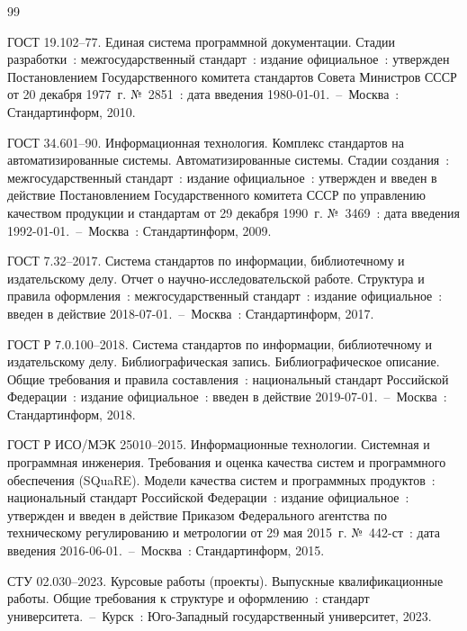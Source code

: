 

\begin{thebibliography}{99}

 ГОСТ 19.102--77. Единая система программной документации. Стадии разработки~: межгосударственный стандарт~: издание официальное~: утвержден Постановлением Государственного комитета стандартов Совета Министров СССР от 20 декабря 1977~г. №~2851~: дата введения 1980-01-01.~--~Москва~: Стандартинформ, 2010.

 ГОСТ 34.601--90. Информационная технология. Комплекс стандартов на автоматизированные системы. Автоматизированные системы. Стадии создания~: межгосударственный стандарт~: издание официальное~: утвержден и введен в действие Постановлением Государственного комитета СССР по управлению качеством продукции и стандартам от 29 декабря 1990~г. №~3469~: дата введения 1992-01-01.~--~Москва~: Стандартинформ, 2009.

 ГОСТ 7.32--2017. Система стандартов по информации, библиотечному и издательскому делу. Отчет о научно-исследовательской работе. Структура и правила оформления~: межгосударственный стандарт~: издание официальное~: введен в действие 2018-07-01.~--~Москва~: Стандартинформ, 2017.

 ГОСТ Р 7.0.100--2018. Система стандартов по информации, библиотечному и издательскому делу. Библиографическая запись. Библиографическое описание. Общие требования и правила составления~: национальный стандарт Российской Федерации~: издание официальное~: введен в действие 2019-07-01.~--~Москва~: Стандартинформ, 2018.

 ГОСТ Р ИСО/МЭК 25010--2015. Информационные технологии. Системная и программная инженерия. Требования и оценка качества систем и программного обеспечения (SQuaRE). Модели качества систем и программных продуктов~: национальный стандарт Российской Федерации~: издание официальное~: утвержден и введен в действие Приказом Федерального агентства по техническому регулированию и метрологии от 29 мая 2015~г. №~442-ст~: дата введения 2016-06-01.~--~Москва~: Стандартинформ, 2015.

 СТУ 02.030--2023. Курсовые работы (проекты). Выпускные квалификационные работы. Общие требования к структуре и оформлению~: стандарт университета.~--~Курск~: Юго-Западный государственный университет, 2023.


\end{thebibliography}
